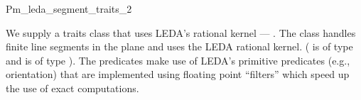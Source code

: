 
\ccRefPageBegin


\renewcommand{\ccRefPageBegin}{\begin{ccAdvanced}}
\renewcommand{\ccRefPageEnd}{\end{ccAdvanced}}

\begin{ccRefClass}{Pm_leda_segment_traits_2}

We supply a traits class that uses LEDA's rational kernel ---
.
The class handles
finite line segments in the plane
and uses the LEDA rational kernel. ( is of type 
 and  is of type
). The predicates make use of LEDA's primitive
predicates (e.g., orientation) that are implemented using floating point
``filters'' \cite{fv-sayee-96} which speed up the use of exact computations.


\ccIsModel

\end{ccRefClass} %

\renewcommand{\ccRefPageBegin}{}
\renewcommand{\ccRefPageEnd}{}

\ccRefPageEnd
